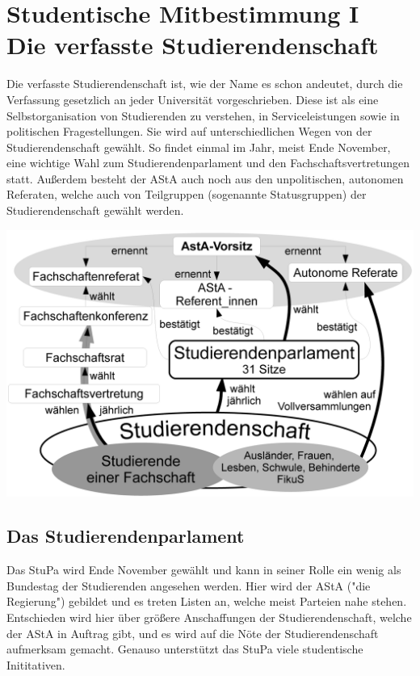 \section[Studentische Mitbestimmung]{Studentische Mitbestimmung I\\Die verfasste Studierendenschaft}
\begin{multicols*}{2}
Die verfasste Studierendenschaft ist, wie der Name es schon andeutet, durch die Verfassung gesetzlich an jeder Universität vorgeschrieben. Diese ist als eine Selbstorganisation von Studierenden zu verstehen, in Serviceleistungen sowie in politischen Fragestellungen. Sie wird auf unterschiedlichen Wegen von der Studierendenschaft gewählt. So findet einmal im Jahr, meist Ende November, eine wichtige Wahl zum Studierendenparlament und den Fachschaftsvertretungen statt. Außerdem besteht der AStA auch noch aus den unpolitischen, autonomen Referaten, welche auch von Teilgruppen (sogenannte Statusgruppen) der Studierendenschaft gewählt werden.

\bigskip
\includegraphics[width=\columnwidth]{res/verfasste_studierendenschaft.png}
\bigskip

\subsection*{Das Studierendenparlament}
Das StuPa wird Ende November gewählt und kann in seiner Rolle ein wenig als Bundestag der Studierenden angesehen werden. Hier wird der AStA ("die Regierung") gebildet und es treten Listen an, welche meist Parteien nahe stehen. Entschieden wird hier über größere Anschaffungen der Studierendenschaft, welche der AStA in Auftrag gibt, und es wird auf die Nöte der Studierendenschaft aufmerksam gemacht. Genauso unterstützt das StuPa viele studentische Inititativen.


\end{multicols*}
